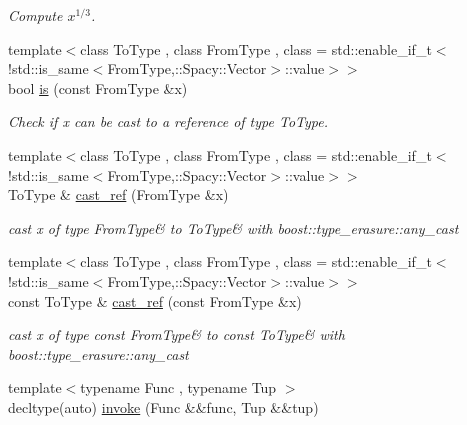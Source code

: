 \begin{DoxyCompactItemize}
\begin{DoxyCompactList}\small\item\em Compute $ x^{1/3} $. \end{DoxyCompactList}\item 
{\footnotesize template$<$class To\+Type , class From\+Type , class  = std\+::enable\+\_\+if\+\_\+t$<$!std\+::is\+\_\+same$<$\+From\+Type,\+::\+Spacy\+::\+Vector$>$\+::value$>$$>$ }\\bool \hyperlink{group__SpacyGroup_ga16b67d1bc0157426af3ee1e91afcf728_ga16b67d1bc0157426af3ee1e91afcf728}{is} (const From\+Type \&x)
\begin{DoxyCompactList}\small\item\em Check if x can be cast to a reference of type To\+Type. \end{DoxyCompactList}\item 
{\footnotesize template$<$class To\+Type , class From\+Type , class  = std\+::enable\+\_\+if\+\_\+t$<$!std\+::is\+\_\+same$<$\+From\+Type,\+::\+Spacy\+::\+Vector$>$\+::value$>$$>$ }\\To\+Type \& \hyperlink{group__SpacyGroup_gaf74aa266d04acaba7263ee8d36b5b906_gaf74aa266d04acaba7263ee8d36b5b906}{cast\+\_\+ref} (From\+Type \&x)
\begin{DoxyCompactList}\small\item\em cast x of type \textquotesingle{}From\+Type\&\textquotesingle{} to \textquotesingle{}To\+Type\&\textquotesingle{} with boost\+::type\+\_\+erasure\+::any\+\_\+cast \end{DoxyCompactList}\item 
{\footnotesize template$<$class To\+Type , class From\+Type , class  = std\+::enable\+\_\+if\+\_\+t$<$!std\+::is\+\_\+same$<$\+From\+Type,\+::\+Spacy\+::\+Vector$>$\+::value$>$$>$ }\\const To\+Type \& \hyperlink{group__SpacyGroup_gaf03cb3abce3186570889439abac37917_gaf03cb3abce3186570889439abac37917}{cast\+\_\+ref} (const From\+Type \&x)
\begin{DoxyCompactList}\small\item\em cast x of type \textquotesingle{}const From\+Type\&\textquotesingle{} to \textquotesingle{}const To\+Type\&\textquotesingle{} with boost\+::type\+\_\+erasure\+::any\+\_\+cast \end{DoxyCompactList}\item 
{\footnotesize template$<$typename Func , typename Tup $>$ }\\decltype(auto) \hyperlink{group__SpacyGroup_ga64250818ba7ff711c207af6ab40ff986_ga64250818ba7ff711c207af6ab40ff986}{invoke} (Func \&\&func, Tup \&\&tup)

\end{DoxyCompactItemize}
